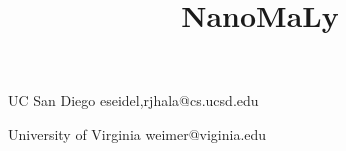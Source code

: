 \documentclass[10pt,pldi,nocopyrightspace,indentedstyle=false]{sigplanconf-pldi15}
\theoremstyle{plain}%
\theoremstyle{definition}
\begin{document}
%
%

\title{NanoMaLy}

           {UC San Diego}
           {{eseidel,rjhala}@cs.ucsd.edu}

           {University of Virginia}
           {weimer@viginia.edu}

\maketitle
\begin{abstract}
\end{abstract}














\end{document}
